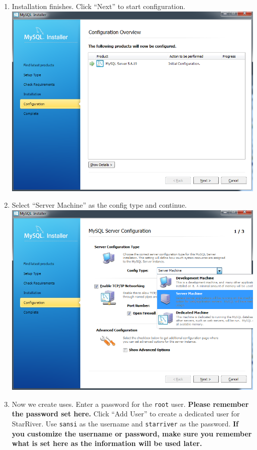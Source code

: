 \begin{enumerate}
\item
  Installation finishes. Click ``Next'' to start configuration.
  \includegraphics{../img/mysql_6.png}
\item
  Select ``Server Machine'' as the config type and continue.
  \includegraphics{../img/mysql_7.png}
\item
  Now we create uses. Enter a password for the \texttt{root} user.
  \textbf{Please remember the password set here.} Click ``Add User'' to
  create a dedicated user for StarRiver. Use \texttt{sansi} as the
  username and \texttt{starriver} as the password. \textbf{If you
  customize the username or password, make sure you remember what is set
  here as the information will be used later.}

\end{enumerate}
